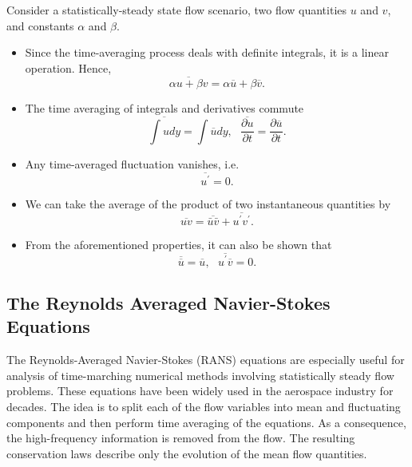Consider a statistically-steady state flow scenario, two flow quantities $u$ and $v$, and constants $\alpha$ and $\beta$.

\begin{itemize}
\item Since the time-averaging process deals with definite integrals, it is a linear operation. Hence, 
\begin{equation}
	\overline{\alpha u + \beta v} = \alpha \overline{u} + \beta \overline{v}.
	\label{eq:reynolds_sum}
\end{equation}
\item The time averaging of integrals and derivatives commute
\begin{equation}
	\overline{\int u dy} = \int \overline{u} dy,  ~~~ \overline{\frac{\partial u}{\partial t}} = \frac{\partial \overline{u}}{\partial t}.
	\label{eq:reynolds_commute}
\end{equation}
\item Any time-averaged fluctuation vanishes, i.e. 
\begin{equation}
	\overline{u^\prime}=0.
	\label{eq:reynolds_fluct}
\end{equation}
\item We can take the average of the product of two instantaneous quantities by
\begin{equation}
	\overline{uv} = \overline{\bar{u}\bar{v}} + \overline{u^\prime v^\prime}.
	\label{eq:reynolds_prod}
\end{equation}
\item From the aforementioned properties, it can also be shown that
\begin{equation}
	\overline{\overline{u}} = \overline{u}, ~~~ \overline{u^\prime \overline{v}} = 0.
	\label{eq:reynolds_avgfluct}
\end{equation}
\end{itemize}

\subsection{The Reynolds Averaged Navier-Stokes Equations}

The Reynolds-Averaged Navier-Stokes (RANS) equations are especially useful for analysis of time-marching numerical methods involving statistically steady flow problems. These equations have been widely used in the aerospace industry for decades. The idea is to split each of the flow variables into mean and fluctuating components and then perform time averaging of the equations. As a consequence, the high-frequency information is removed from the flow. The resulting conservation laws describe only the evolution of the mean flow quantities. 

